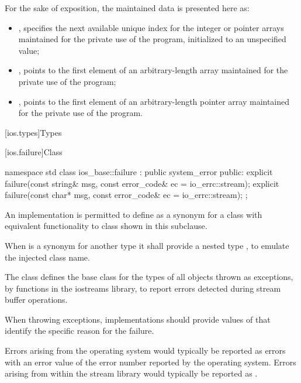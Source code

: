 \pnum
\begin{note}
For the sake of exposition, the maintained data is presented here as:
\begin{itemize}
\item
{},
specifies the next available
unique index for the integer or pointer arrays maintained for the private use
of the program, initialized to an unspecified value;
\item
{},
points to the first element of an
arbitrary-length
array maintained for the private use of the
program;
\item
{},
points to the first element of an
arbitrary-length pointer array maintained for the private use of the program.
\end{itemize}
\end{note}

[ios.types]{Types}

[ios.failure]{Class }

%
%
\begin{codeblock}
namespace std {
  class ios_base::failure : public system_error {
  public:
    explicit failure(const string& msg, const error_code& ec = io_errc::stream);
    explicit failure(const char* msg, const error_code& ec = io_errc::stream);
  };
}
\end{codeblock}

\pnum
An implementation is permitted to define 
as a synonym for a class with equivalent functionality
to class  shown in this subclause.
\begin{note}
When  is a synonym for another type
it shall provide a nested type ,
to emulate the injected class name.
\end{note}
The class
defines the base class
for the types of all objects thrown as exceptions,
by functions in the iostreams library,
to report errors detected during stream buffer operations.

\pnum
When throwing  exceptions, implementations should provide
values of  that identify the specific reason for the failure.
\begin{note}
Errors arising from the operating system would typically be reported as
 errors with an error value of the error number
reported by the operating system. Errors arising from within the stream library would
typically be reported as .
\end{note}

